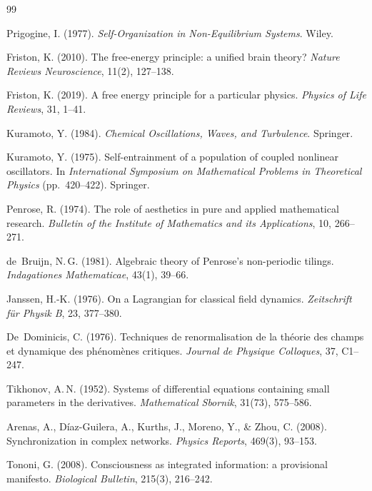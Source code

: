 \documentclass[12pt,a4paper]{article}
\theoremstyle{plain}
\theoremstyle{definition}
\begin{document}
\begin{thebibliography}{99}

Prigogine, I. (1977).
\textit{Self-Organization in Non-Equilibrium Systems}.
Wiley.

Friston, K. (2010).
The free-energy principle: a unified brain theory?
\textit{Nature Reviews Neuroscience}, 11(2), 127--138.

Friston, K. (2019).
A free energy principle for a particular physics.
\textit{Physics of Life Reviews}, 31, 1--41.

Kuramoto, Y. (1984).
\textit{Chemical Oscillations, Waves, and Turbulence}.
Springer.

Kuramoto, Y. (1975).
Self-entrainment of a population of coupled nonlinear oscillators.
In \textit{International Symposium on Mathematical Problems in Theoretical
Physics} (pp.~420--422). Springer.

Penrose, R. (1974).
The role of aesthetics in pure and applied mathematical research.
\textit{Bulletin of the Institute of Mathematics and its Applications},
10, 266--271.

de~Bruijn, N.\,G. (1981).
Algebraic theory of Penrose's non-periodic tilings.
\textit{Indagationes Mathematicae}, 43(1), 39--66.

Janssen, H.-K. (1976).
On a Lagrangian for classical field dynamics.
\textit{Zeitschrift f\"{u}r Physik B}, 23, 377--380.

De~Dominicis, C. (1976).
Techniques de renormalisation de la th\'{e}orie des champs et dynamique
des ph\'{e}nom\`{e}nes critiques.
\textit{Journal de Physique Colloques}, 37, C1--247.

Tikhonov, A.\,N. (1952).
Systems of differential equations containing small parameters in the
derivatives.
\textit{Mathematical Sbornik}, 31(73), 575--586.

Arenas, A., D\'{i}az-Guilera, A., Kurths, J., Moreno, Y., \& Zhou, C.
(2008).
Synchronization in complex networks.
\textit{Physics Reports}, 469(3), 93--153.

Tononi, G. (2008).
Consciousness as integrated information: a provisional manifesto.
\textit{Biological Bulletin}, 215(3), 216--242.


\end{thebibliography}
\end{document}
